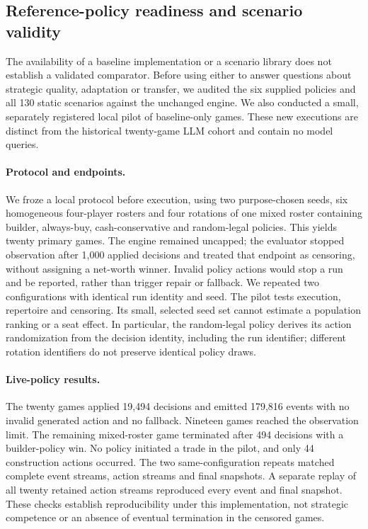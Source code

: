 \subsection{Reference-policy readiness and scenario validity}
\label{sec:agenda-reference-readiness}

The availability of a baseline implementation or a scenario library does not establish a validated comparator. Before using either to answer questions about strategic quality, adaptation or transfer, we audited the six supplied policies and all 130 static scenarios against the unchanged engine. We also conducted a small, separately registered local pilot of baseline-only games. These new executions are distinct from the historical twenty-game LLM cohort and contain no model queries.

\paragraph{Protocol and endpoints.}
We froze a local protocol before execution, using two purpose-chosen seeds, six homogeneous four-player rosters and four rotations of one mixed roster containing builder, always-buy, cash-conservative and random-legal policies. This yields twenty primary games. The engine remained uncapped; the evaluator stopped observation after 1,000 applied decisions and treated that endpoint as censoring, without assigning a net-worth winner. Invalid policy actions would stop a run and be reported, rather than trigger repair or fallback. We repeated two configurations with identical run identity and seed. The pilot tests execution, repertoire and censoring. Its small, selected seed set cannot estimate a population ranking or a seat effect. In particular, the random-legal policy derives its action randomization from the decision identity, including the run identifier; different rotation identifiers do not preserve identical policy draws.

\paragraph{Live-policy results.}
The twenty games applied 19,494 decisions and emitted 179,816 events with no invalid generated action and no fallback. Nineteen games reached the observation limit. The remaining mixed-roster game terminated after 494 decisions with a builder-policy win. No policy initiated a trade in the pilot, and only 44 construction actions occurred. The two same-configuration repeats matched complete event streams, action streams and final snapshots. A separate replay of all twenty retained action streams reproduced every event and final snapshot. These checks establish reproducibility under this implementation, not strategic competence or an absence of eventual termination in the censored games.

